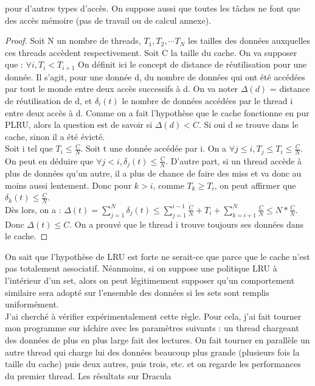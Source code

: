 \documentclass{report}
\begin{document}
pour d'autres types d'accès. On suppose aussi que toutes les tâches ne font que des accès mémoire
(pas de travail ou de calcul annexe). 
\begin{proof}
Soit N un nombre de threads, $T_1, T_2, \cdots T_N$ les tailles des données auxquelles ces threads
accèdent respectivement. Soit C la taille du cache. On va supposer que :
$\forall i, T_{i} < T_{i+1}$
On définit ici le concept de distance de réutilisation pour une donnée. Il s'agit, pour une 
donnée d, du nombre de données qui ont été accédées par tout le monde entre deux accès successifs
à d. On va noter $\Delta(d)$ = distance de réutilisation de d, et $\delta_{i}(t)$ le nombre de 
données accédées par le thread i entre deux accès à d.
Comme on a fait l'hypothèse que le cache fonctionne en pur PLRU, alors la question est de
savoir si $\Delta(d) < C$. Si oui d se trouve dans le cache, sinon il a été évicté.
\\Soit i tel que $T_i \leq \frac{C}{N}$. Soit t une donnée accédée par i.
On a $\forall j \leq i, T_{j} \leq T_{i} \leq \frac{C}{N}$.  On peut en déduire que $\forall j < i, 
\delta_{j}(t) \leq \frac{C}{N}$.
D'autre part, si un thread accède à plus de données qu'un autre, il a plus de chance de faire
des miss et va donc au moins aussi lentement.
Donc pour $k > i$, comme ${T_{k}}\geq{T_{i}}$, on peut affirmer que $\delta_k(t)\leq \frac{C}{N}$.
\\Dès lors, on a : $\Delta(t) = \sum_{j=1}^{N} {\delta_{j}(t)} \leq \sum_{j=1}^{i-1}{\frac{C}{N}} + 
T_i + \sum_{k=i+1}^{N}{\frac{C}{N}} \leq N * \frac{C}{N} $.
\\Donc $\Delta(t) \leq C$. On a prouvé que le thread i trouve toujours ses données dans le cache.
\end{proof}
On sait que l'hypothèse de LRU est forte ne serait-ce que parce que le cache n'est pas totalement
associatif. Néanmoins, si on suppose une politique LRU à l'intérieur d'un set, alors on peut 
légitimement supposer qu'un comportement similaire sera adopté sur l'ensemble des données si 
les sets sont remplis uniformément.
\\J'ai cherché à vérifier expérimentalement cette règle. Pour cela, j'ai fait tourner mon
programme sur idchire avec les paramètres suivants : un thread chargeant des données de plus
en plus large fait des lectures. On fait tourner en parallèle un autre thread qui charge lui 
des données beaucoup plus grande (plusieurs fois la taille du cache) puis deux autres, puis 
trois, etc. et on regarde les performances du premier thread. Les résultats sur Dracula
\end{document}
